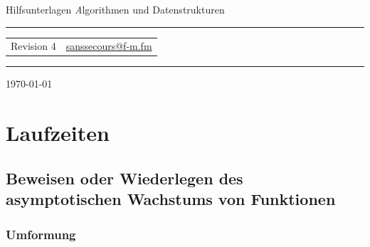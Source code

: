 \documentclass[a4paper, 12pt]{article}
\makeatletter
\newcommand{\TITLE}{Hilfsunterlagen}
\newcommand{\TITLEDESCRIPTION}{Algorithmen und Datenstrukturen}
\newcommand{\REVISION}{4}
\newcommand{\MAILONE}{\href{mailto:sanssecours@f-m.fm}{sanssecours@f-m.fm}}
\makeatother
\begin{document}
\begin{titlepage}
	\begin{center}
		{\Huge\zapfino \TITLE}
		\vskip 1cm
		{\Large\textit\TITLEDESCRIPTION}
		\vskip 2cm
		\hrule
		\vskip 0.5cm
		\begin{tabular}{p{8cm}l}
			Revision \REVISION	& \MAILONE\\
		\end{tabular}
		\vskip 0.5cm
		\hrule
		\vskip 11cm
	\end{center}
	\begin{flushright}
		\today
	\end{flushright}
\end{titlepage}


\makeatletter \renewcommand{\@dotsep}{10000} \makeatother
\newpage
\setcounter{page}{2}
\tableofcontents
\newpage
\pagestyle{scrheadings}


\begin{abstract}
	\noindent Dieser Text ist mit der Absicht entstanden zu helfen. Ich habe ihn somit natürlich nicht aus Absicht mit Fehlern gespickt. Trotzdem ist es doch sehr wahrscheinlich, dass er Fehler enthält. Ich bitte das zu Entschuldigen, und möchte damit den Hinweis geben, dass für jeglichen Inhalt dieses Textes \emph{absolut kein Gewähr auf Richtigkeit} gegeben wird.\\

	\noindent Solltet ihr Fehler im Text finden wäre es sehr nett wenn ihr mir eine \href{mailto:sanssecours@f-m.fm}{e-Mail} schreibt, damit ich sie ausbessern kann.
\end{abstract}

\section{Laufzeiten}

\subsection{Beweisen oder Wiederlegen des asymptotischen Wachstums von Funktionen}

\subsubsection{Umformung}
\end{document}
